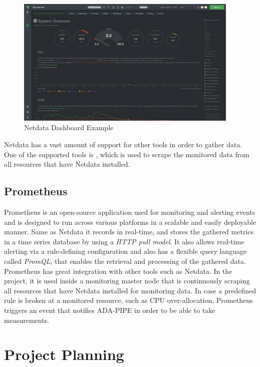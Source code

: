 \documentclass{article}
\begin{document}
            \begin{figure}[h!]
                \centering
                \includegraphics[width=0.95\textwidth]{figures/netdata.png}
                \caption{Netdata Dashboard Example}
                \label{fig:netdata-dashboard}
            \end{figure}
            Netdata has a vast amount of support for other tools in order to gather data. 
            One of the supported tools is , which is used to scrape the monitored data from all resources that have Netdata installed.


        \subsection{Prometheus}
        \label{sec:prometheus}

            Prometheus is an open-source application used for monitoring and alerting events and is designed to run across various platforms in a scalable and easily deployable manner.
            Same as Netdata it records in real-time, and stores the gathered metrics in a time series database by using a \emph{HTTP pull model}. It also allows real-time alerting via a rule-defining configuration and also has a flexible query language called \emph{PromQL}, that enables the retrieval and processing of the gathered data. Prometheus has great integration with other tools such as Netdata.
            In the project, it is used inside a monitoring master node that is continuously scraping all resources that have Netdata installed for monitoring data. In case a predefined rule is broken at a monitored resource, such as CPU over-allocation, Prometheus triggers an event that notifies ADA-PIPE in order to be able to take measurements.
            

    \section{Project Planning}
\end{document}
